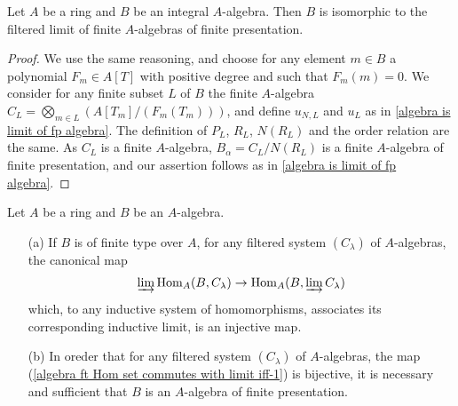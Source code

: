 \begin{corollary}\label{algebra integral is limit of finite fp algebra}
Let $A$ be a ring and $B$ be an integral $A$-algebra. Then $B$ is isomorphic to the filtered limit of finite $A$-algebras of finite presentation.
\end{corollary}
\begin{proof}
We use the same reasoning, and choose for any element $m\in B$ a polynomial $F_m\in A[T]$ with positive degree and such that $F_m(m)=0$. We consider for any finite subset $L$ of $B$ the finite $A$-algebra $C_L=\bigotimes_{m\in L}(A[T_m]/(F_m(T_m)))$, and define $u_{N,L}$ and $u_L$ as in \cref{algebra is limit of fp algebra}. The definition of $P_L$, $R_L$, $N(R_L)$ and the order relation are the same. As $C_L$ is a finite $A$-algebra, $B_\alpha=C_L/N(R_L)$ is a finite $A$-algebra of finite presentation, and our assertion follows as in \cref{algebra is limit of fp algebra}.
\end{proof}
\begin{proposition}\label{algebra ft Hom set commutes with limit iff}
Let $A$ be a ring and $B$ be an $A$-algebra.
\begin{itemize}
\item[(a)] If $B$ is of finite type over $A$, for any filtered system $(C_\lambda)$ of $A$-algebras, the canonical map
\begin{align}\label{algebra ft Hom set commutes with limit iff-1}
\varinjlim\mathrm{Hom}_{A}(B,C_\lambda)\to\mathrm{Hom}_{A}(B,\varinjlim C_\lambda)
\end{align}
which, to any inductive system of homomorphisms, associates its corresponding inductive limit, is an injective map.
\item[(b)] In oreder that for any filtered system $(C_\lambda)$ of $A$-algebras, the map (\ref{algebra ft Hom set commutes with limit iff-1}) is bijective, it is necessary and sufficient that $B$ is an $A$-algebra of finite presentation.
\end{itemize}
\end{proposition}
